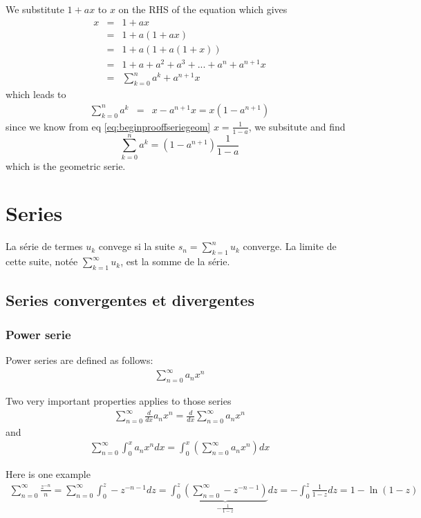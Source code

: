 We substitute $1+ax$ to $x$ on the RHS of the equation which gives
\begin{eqnarray*}
	x &=& 1+ax\\
	&=& 1 + a(1+ax)\\
	&=& 1 + a(1+a(1+x))\\
	&=& 1 + a + a^2 + a^3 + ... +a^n + a^{n+1}x\\
	&=& \sum_{k=0}^n a^k + a^{n+1}x
\end{eqnarray*}
which leads to
\begin{eqnarray*}
	\sum_{k=0}^n a^k &=&   x-a^{n+1}x= x\left(1-a^{n+1}\right)
\end{eqnarray*}
since we know from eq \ref{eq:beginprooffseriegeom} $x=\frac{1}{1-a}$, we subsitute and find
\begin{equation*}
	\sum_{k=0}^n a^k =  \left(1-a^{n+1}\right)\frac{1}{1-a}
\end{equation*}
which is the geometric serie.

\chapter{Series}
La série de termes $u_k$ convege si la suite $s_n=\sum_{k=1}^nu_k$ converge. La limite de cette suite, notée $\sum_{k=1}^\infty u_k$, est la somme de la série.
\section{Series convergentes et divergentes}
\subsection{Power serie}
Power series are defined as follows:
\begin{eqnarray}
	\sum_{n=0}^{\infty}a_nx^n
\end{eqnarray}

Two very important properties applies to those series
\begin{eqnarray}
	\sum_{n=0}^{\infty}\frac{d}{dx}a_nx^n=\frac{d}{dx}\sum_{n=0}^{\infty}a_nx^n
\end{eqnarray}
and
\begin{eqnarray}
	\sum_{n=0}^{\infty}\int_0^{x}a_nx^ndx=\int_0^x\left(\sum_{n=0}^{\infty}a_nx^n\right)dx
\end{eqnarray}

Here is one example
\begin{eqnarray*}
	\sum_{n=0}^{\infty}\frac{z^{-n}}{n}=\sum_{n=0}^{\infty}\int_0^z-z^{-n-1}dz=\int_0^z\underbrace{\left(\sum_{n=0}^{\infty}-z^{-n-1}\right)}_{-\frac{1}{1-z}}dz=-\int_0^z\frac{1}{1-z}dz=1-\ln{(1-z)}
\end{eqnarray*}


